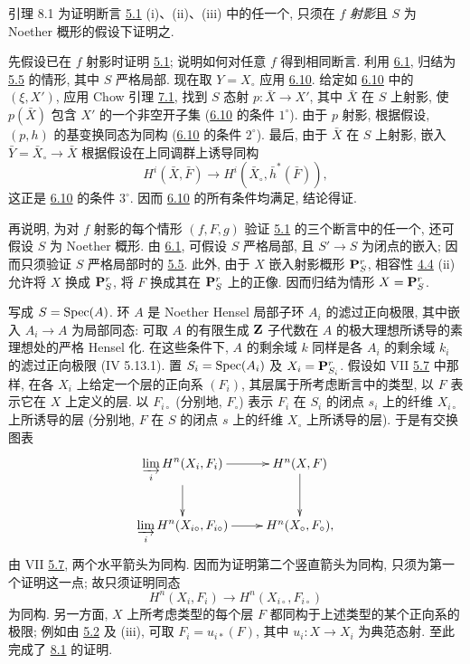 \begin{enonce*}{引理 8.1}
为证明断言 {\rm \hyperref[XII.thm5.1]{5.1} (i)、(ii)、(iii)} 中的任一个, 只须在 $f$ \emph{射影}且 $S$ 为 Noether 概形的假设下证明之.
\end{enonce*}

先假设已在 $f$ 射影时证明 \hyperref[XII.thm5.1]{5.1}; 说明如何对任意 $f$ 得到相同断言. 利用 \hyperref[XII.lem6.1]{6.1}, 归结为 \hyperref[XII.cor5.5]{5.5} 的情形, 其中 $S$ 严格局部. 现在取 $Y=X_{\circ}$ 应用 \hyperref[XII.cor6.10]{6.10}. 给定如 \hyperref[XII.cor6.10]{6.10} 中的 $(\xi,X')$, 应用 Chow 引理 \hyperref[XII.lem7.1]{7.1}, 找到 $S$ 态射 $p:\bar{X}\rightarrow X'$, 其中 $\bar{X}$ 在 $S$ 上射影, 使 $p(\bar{X})$ 包含 $X'$ 的一个非空开子集 (\hyperref[XII.cor6.10]{6.10} 的条件 $1^{\circ}$). 由于 $p$ 射影, 根据假设, $(p,h)$ 的基变换同态为同构 (\hyperref[XII.cor6.10]{6.10} 的条件 $2^{\circ}$). 最后, 由于 $\bar{X}$ 在 $S$ 上射影, 嵌入 $\bar{Y}=\bar{X}_{\circ}\rightarrow\bar{X}$ 根据假设在上同调群上诱导同构
$$
H^{i}(\bar{X},\bar{F})\longrightarrow
H^{i}(\bar{X}_{\circ},\bar{h}^{\ast}(\bar{F})),
$$
这正是 \hyperref[XII.cor6.10]{6.10} 的条件 $3^{\circ}$. 因而 \hyperref[XII.cor6.10]{6.10} 的所有条件均满足, 结论得证.

再说明, 为对 $f$ 射影的每个情形 $(f,F,g)$ 验证 \hyperref[XII.thm5.1]{5.1} 的三个断言中的任一个, 还可假设 $S$ 为 Noether 概形. 由 \hyperref[XII.lem6.1]{6.1}, 可假设 $S$ 严格局部, 且 $S'\rightarrow S$ 为闭点的嵌入; 因而只须验证 $S$ 严格局部时的 \hyperref[XII.cor5.5]{5.5}. 此外, 由于 $X$ 嵌入射影概形 $\mathbf{P}^r_S$, 相容性 \hyperref[XII.prop4.4]{4.4} (ii) 允许将 $X$ 换成 $\mathbf{P}^r_S$, 将 $F$ 换成其在 $\mathbf{P}^r_S$ 上的正像. 因而归结为情形 $X=\mathbf{P}^r_S$.

写成 $S=\operatorname{Spec}(A)$. 环 $A$ 是 Noether Hensel 局部子环 $A_i$ 的滤过正向极限, 其中嵌入 $A_i\rightarrow A$ 为局部同态: 可取 $A$ 的有限生成 $\mathbf{Z}$ 子代数在 $A$ 的极大理想所诱导的素理想处的严格 Hensel 化. 在这些条件下, $A$ 的剩余域 $k$ 同样是各 $A_i$ 的剩余域 $k_i$ 的滤过正向极限 (\EGA IV 5.13.1). 置 $S_i=\operatorname{Spec}(A_i)$ 及 $X_i=\mathbf{P}^r_{S_i}$. 假设如 VII \hyperref[VII.thm5.7]{5.7} 中那样, 在各 $X_i$ 上给定一个层的正向系 $(F_i)$, 其层属于所考虑断言中的类型, 以 $F$ 表示它在 $X$ 上定义的层. 以 $F_{i\circ}$ (分别地, $F_{\circ}$) 表示 $F_i$ 在 $S_i$ 的闭点 $s_i$ 上的纤维 $X_{i\circ}$ 上所诱导的层 (分别地, $F$ 在 $S$ 的闭点 $s$ 上的纤维 $X_{\circ}$ 上所诱导的层). 于是有交换图表
$$
\xymatrix{
\displaystyle\mathop{\varinjlim}_{i} H^{n}(X_i,F_i) \ar[r] \ar[d]&
H^{n}(X,F)\ar[d]\\
\displaystyle\mathop{\varinjlim}_{i} H^{n}(X_{i\circ},F_{i\circ}) \ar[r] &
H^{n}(X_{\circ},F_{\circ}),
}
$$
由 VII \hyperref[VII.thm5.7]{5.7}, 两个水平箭头为同构. 因而为证明第二个竖直箭头为同构, 只须为第一个证明这一点; 故只须证明同态
$$
H^n(X_i,F_i)\longrightarrow H^n(X_{i\circ},F_{i\circ})
$$
为同构. 另一方面, $X$ 上所考虑类型的每个层 $F$ 都同构于上述类型的某个正向系的极限; 例如由 \hyperref[XII.cor5.2]{5.2} 及  (iii), 可取 $F_i=u_{i*}(F)$, 其中 $u_i:X\rightarrow X_i$ 为典范态射. 至此完成了 \hyperref[XII.lem8.1]{8.1} 的证明.

